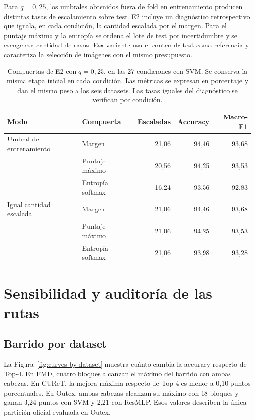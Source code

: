 \documentclass[a4paper,fleqn]{cas-sc}
\begin{document}
Para $q=0{,}25$, los umbrales obtenidos fuera de fold en entrenamiento producen distintas tasas de escalamiento sobre test. E2 incluye un diagnóstico retrospectivo que iguala, en cada condición, la cantidad escalada por el margen. Para el puntaje máximo y la entropía se ordena el lote de test por incertidumbre y se escoge esa cantidad de casos. Esa variante usa el conteo de test como referencia y caracteriza la selección de imágenes con el mismo presupuesto.

\begin{table}[pos=htbp]
\centering
\caption{Compuertas de E2 con $q=0{,}25$, en las 27 condiciones con SVM. Se conserva la misma etapa inicial en cada condición. Las métricas se expresan en porcentaje y dan el mismo peso a los seis datasets. Las tasas iguales del diagnóstico se verifican por condición.}
\label{tab:e2-compuertas}
\small
\begin{tabular}{@{}llrrr@{}}
\toprule
Modo & Compuerta & Escaladas & Accuracy & Macro-F1 \\
\midrule
Umbral de entrenamiento & Margen & 21,06 & 94,46 & 93,68 \\
 & Puntaje máximo & 20,56 & 94,25 & 93,53 \\
 & Entropía softmax & 16,24 & 93,56 & 92,83 \\
\addlinespace
Igual cantidad escalada & Margen & 21,06 & 94,46 & 93,68 \\
 & Puntaje máximo & 21,06 & 94,25 & 93,53 \\
 & Entropía softmax & 21,06 & 93,98 & 93,28 \\
\bottomrule
\end{tabular}
\end{table}
\FloatBarrier

\section{Sensibilidad y auditoría de las rutas}

\subsection{Barrido por dataset}

La Figura~\ref{fig:curves-by-dataset} muestra cuánto cambia la accuracy respecto de Top-4. En FMD, cuatro bloques alcanzan el máximo del barrido con ambas cabezas. En CUReT, la mejora máxima respecto de Top-4 es menor a 0,10 puntos porcentuales. En Outex, ambas cabezas alcanzan su máximo con 18 bloques y ganan 3,24 puntos con SVM y 2,21 con ResMLP. Esos valores describen la única partición oficial evaluada en Outex.
\end{document}
